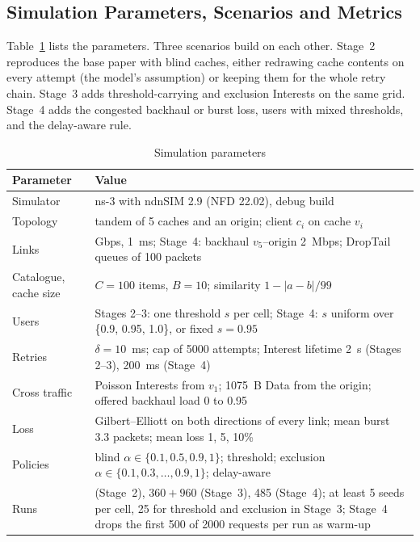 \documentclass[11pt,a4paper]{article}
\renewcommand{\arraystretch}{1.45}
\begin{document}
\subsection{Simulation Parameters, Scenarios and Metrics}
Table~\ref{tab:setup} lists the parameters. Three scenarios build on each other. Stage~2 reproduces
the base paper with blind caches, either redrawing cache contents on every attempt (the model's
assumption) or keeping them for the whole retry chain. Stage~3 adds threshold-carrying and
exclusion Interests on the same grid. Stage~4 adds the congested backhaul or burst loss, users
with mixed thresholds, and the delay-aware rule.

\begin{table}[H]
\centering
\caption{Simulation parameters}
\label{tab:setup}
\small
\renewcommand{\arraystretch}{1.2}
\begin{tabularx}{\linewidth}{@{}>{\raggedright}p{3.3cm}>{\raggedright\arraybackslash}X@{}}
\toprule
\textbf{Parameter} & \textbf{Value} \\
\midrule
Simulator & ns-3 with ndnSIM 2.9 (NFD 22.02), debug build \\
Topology & tandem of 5 caches and an origin; client $c_i$ on cache $v_i$ \\
Links & 1 Gbps, 1~ms; Stage~4: backhaul $v_5$--origin 2~Mbps; DropTail queues of 100 packets \\
Catalogue, cache size & $C = 100$ items, $B = 10$; similarity $1 - |a-b|/99$ \\
Users & Stages 2--3: one threshold $s$ per cell; Stage~4: $s$ uniform over \{0.9, 0.95, 1.0\}, or fixed $s = 0.95$ \\
Retries & $\delta = 10$~ms; cap of 5000 attempts; Interest lifetime 2~s (Stages 2--3), 200~ms (Stage~4) \\
Cross traffic & Poisson Interests from $v_1$; 1075~B Data from the origin; offered backhaul load 0 to 0.95 \\
Loss & Gilbert--Elliott on both directions of every link; mean burst 3.3 packets; mean loss 1, 5, 10\% \\
Policies & blind $\alpha \in \{0.1, 0.5, 0.9, 1\}$; threshold; exclusion $\alpha \in \{0.1, 0.3, \dots, 0.9, 1\}$; delay-aware \\
Runs & 120 (Stage~2), $360 + 960$ (Stage~3), 485 (Stage~4); at least 5 seeds per cell, 25 for threshold and exclusion in Stage~3; Stage~4 drops the first 500 of 2000 requests per run as warm-up \\
\bottomrule
\end{tabularx}
\end{table}
\end{document}
